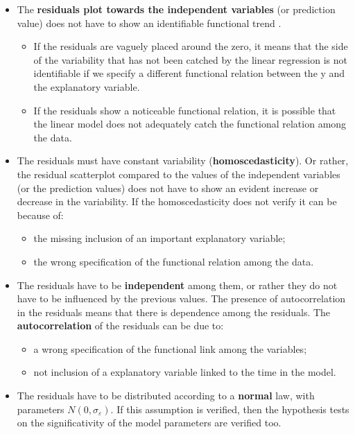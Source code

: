 \begin{frame}
  \vspace*{-.15cm}
  \begin{itemize}
    \item The \textbf{residuals plot towards the independent variables} (or prediction value) does not have to show an identifiable functional trend .
    \begin{itemize}
      \item If the residuals are vaguely placed around the zero, it means that the side of the variability that has not been catched by the linear regression is not identifiable if we specify a different functional relation between the y and the explanatory variable.
      \item If the residuals show a noticeable functional relation, it is possible that the linear model does not adequately catch the functional relation among the data.
    \end{itemize}
    \item The residuals must have constant variability (\textbf{homoscedasticity}). Or rather, the residual scatterplot compared to the values of the independent variables (or the prediction values) does not have to show an evident increase or decrease in the variability. If the homoscedasticity does not verify it can be because of:
    \begin{itemize}
      \item the missing inclusion of an important explanatory variable;
      \item the wrong specification of the functional relation among the data.
    \end{itemize}
  \end{itemize}
\end{frame}

\begin{frame}
  \vspace{.5cm}
  \begin{itemize}
    \item The residuals have to be \textbf{independent} among them, or rather they do not have to be influenced by the previous values. The presence of autocorrelation in the residuals means that there is dependence among the residuals. The \textbf{autocorrelation} of the residuals can be due to:
    \begin{itemize}
      \item a wrong specification of the functional link among the variables;
      \item not inclusion of a explanatory variable linked to the time in the model.
    \end{itemize}
  \vspace{.5cm}
  \item The residuals have to be distributed according to a \textbf{normal} law, with parameters $ N(0, \sigma_\varepsilon)$. If this assumption is verified, then the hypothesis tests on the significativity of the model parameters are verified too. 
  \end{itemize}
\end{frame}

